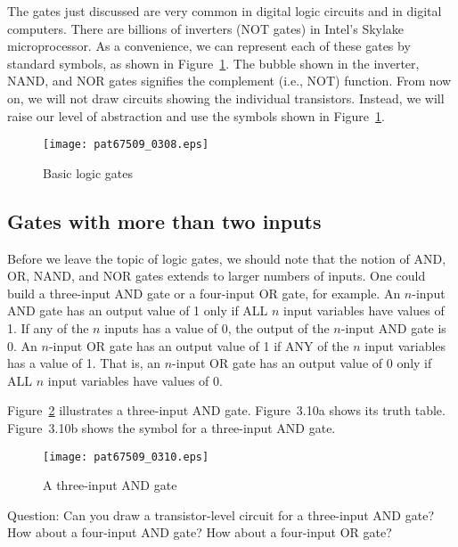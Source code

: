 \documentclass{patt}
\begin{document}
\enlargethispage{-2\baselineskip}

The gates just discussed are very common in digital logic circuits and
in digital computers.  There are billions of inverters (NOT gates) in
Intel's Skylake microprocessor.  As a convenience, we can represent
each of these gates by standard symbols, as shown in 
Figure~\ref{fig:logicgates}.  The bubble shown in the inverter, NAND, and 
NOR gates signifies the complement (i.e., NOT) function.  
From now on, we will not draw circuits showing the individual
transistors.  Instead, we will raise our level of abstraction and use
the symbols shown in Figure~\ref{fig:logicgates}.

\begin{figure}[b]
\vspace{-6pt} \centerline{\texttt{[image: pat67509\_0308.eps]}}
\caption{Basic logic gates}\label{fig:logicgates}
\end{figure}

\FloatBarrier
\subsection{Gates with more than two inputs}

Before we leave the topic of logic gates, we should note that the
notion of AND, OR, NAND, and NOR gates extends to larger numbers of
inputs.  One could build a three-input AND gate or a four-input OR
gate, for example.  An $n$-input AND gate has an output value of 1
only if ALL $n$ input variables have values of 1.  If any of the $n$
inputs has a value of 0, the output of the $n$-input AND gate is 0.
An $n$-input OR gate has an output value of 1 if ANY of the $n$ input
variables has a value of 1.  That is, an $n$-input OR gate has an
output value of 0 only if ALL $n$ input variables have values of 0.

Figure~\ref{fig:3and} illustrates a three-input AND gate.  Figure~3.10a shows
its truth table.  Figure~3.10b shows the symbol for a three-input AND
gate.

\begin{figure}
\centerline{\texttt{[image: pat67509\_0310.eps]}}
\caption{A three-input AND gate}\label{fig:3and}
\vspace{-6pt}
\end{figure}

Question: Can you draw a transistor-level circuit for a three-input AND 
gate?  How about a four-input AND gate?  How about a four-input OR gate?
\end{document}
